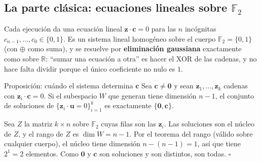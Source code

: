 \documentclass[11pt, a4paper, twoside, openright]{report}
\newcommand{\bz}{\mathbf{z}}
\newcommand{\bc}{\mathbf{c}}
\newcommand{\bcero}{\mathbf{0}}
\newcommand{\F}{\mathbb{F}_2}
\begin{document}
\subsection{La parte clásica: ecuaciones lineales sobre $\F$}

\noindent Cada ejecución da una ecuación lineal $\bz\cdot\bc = 0$ para las $n$ incógnitas $c_{n-1},\dots,c_0\in\{0,1\}$. Es un sistema lineal homogéneo sobre el cuerpo $\F = \{0,1\}$ (con $\oplus$ como suma), y se resuelve por \textbf{eliminación gaussiana} exactamente como sobre $\mathbb{R}$: ``sumar una ecuación a otra'' es hacer el XOR de las cadenas, y no hace falta dividir porque el único coeficiente no nulo es $1$.

\begin{teoria}{Proposición: cuándo el sistema determina $\bc$}
Sea $\bc\neq\bcero$ y sean $\bz_1,\dots,\bz_k$ cadenas con $\bz_i\cdot\bc = 0$. Si el subespacio $W$ que generan tiene dimensión $n-1$, el conjunto de soluciones de $\{\bz_i\cdot\mathbf{u} = 0\}_{i=1}^k$ es exactamente $\{\bcero, \bc\}$.
\end{teoria}

\begin{demo}
Sea $Z$ la matriz $k\times n$ sobre $\F$ cuyas filas son las $\bz_i$. Las soluciones son el núcleo de $Z$, y el rango de $Z$ es $\dim W = n-1$. Por el teorema del rango (válido sobre cualquier cuerpo), el núcleo tiene dimensión $n - (n-1) = 1$, así que tiene $2^1 = 2$ elementos. Como $\bcero$ y $\bc$ son soluciones y son distintos, son todas. \hfill$\square$
\end{demo}
\end{document}
